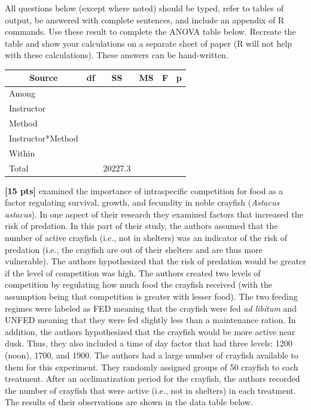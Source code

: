 \documentclass[10pt,openany]{book}\usepackage[]{graphicx}\usepackage[]{color}
\begin{document}
\begin{hwsection}{All questions below (except where noted) should be typed, refer to tables of output, be answered with complete sentences, and include an appendix of R commands.}
Use these result to complete the ANOVA table below.  Recreate the table and show your calculations on a separate sheet of paper (R will not help with these calculations).  These answers can be hand-written.

      \begin{center}
        \begin{tabular}{|c|c|c|c|c|c|}
          \hline
          Source & df & SS & MS & F & p \\
          \hline
          \multicolumn{1}{|l|}{Among} &  &  &  &  &  \\
          \hline
          \multicolumn{1}{|l|}{   Instructor} &  &  &  &  &  \\
          \hline
          \multicolumn{1}{|l|}{   Method} &  &  &  &  &  \\
          \hline
          \multicolumn{1}{|l|}{   Instructor*Method} &  &  &  &  &  \\
          \hline
          \multicolumn{1}{|l|}{Within} &  &  &  & \multicolumn{1}{c}{} & \multicolumn{1}{c}{} \\
          \cline{1-4}
          \multicolumn{1}{|l|}{Total} &  & 20227.3 & \multicolumn{1}{c}{} & \multicolumn{1}{c}{} & \multicolumn{1}{c}{} \\
          \cline{1-3}
        \end{tabular}
      \end{center}

  \item \label{hwprob:LMANOVA2Crayfish} \textbf{[15 pts]} \cite{NystromGraneli1997} examined the importance of intraspecific competition for food as a factor regulating survival, growth, and fecundity in noble crayfish (\emph{Astacus astacus}).  In one aspect of their research they examined factors that increased the risk of predation.  In this part of their study, the authors assumed that the number of active crayfish (i.e., not in shelters) was an indicator of the risk of predation (i.e., the crayfish are out of their shelters and are thus more vulnerable).  The authors hypothesized that the risk of predation would be greater if the level of competition was high.  The authors created two levels of competition by regulating how much food the crayfish received (with the assumption being that competition is greater with lesser food).  The two feeding regimes were labeled as FED meaning that the crayfish were fed \emph{ad libitum} and UNFED meaning that they were fed slightly less than a maintenance ration.  In addition, the authors hypothesized that the crayfish would be more active near dusk.  Thus, they also included a time of day factor that had three levels:  1200 (noon), 1700, and 1900.  The authors had a large number of crayfish available to them for this experiment.  They randomly assigned groups of 50 crayfish to each treatment.  After an acclimatization period for the crayfish, the authors recorded the number of crayfish that were active (i.e., not in shelters) in each treatment.  The results of their observations are shown in the data table below.


\end{hwsection}
\end{document}
